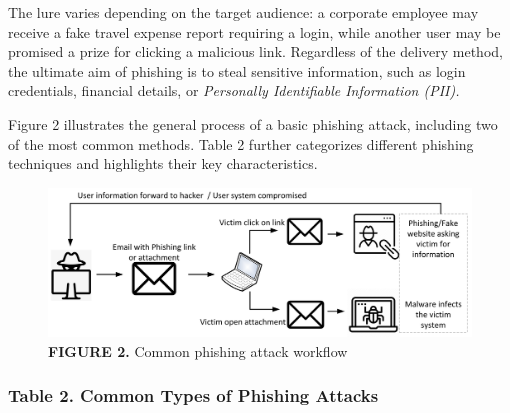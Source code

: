 The lure varies depending on the target audience: a corporate employee may receive a fake travel expense report requiring a login, while another user may be promised a prize for clicking a malicious link. Regardless of the delivery method, the ultimate aim of phishing is to steal sensitive information, such as login credentials, financial details, or \textit{Personally Identifiable Information (PII).}

Figure 2 illustrates the general process of a basic phishing attack, including two of the most common methods. Table 2 further categorizes different phishing techniques and highlights their key characteristics.

\begin{figure}
    \centering
    \includegraphics[width=1\linewidth]{phish.png}
    \caption{\textbf{FIGURE 2. }Common phishing attack workflow}
    \label{fig:placeholder}
\end{figure}
\subsubsection{Table 2. Common Types of Phishing Attacks}


